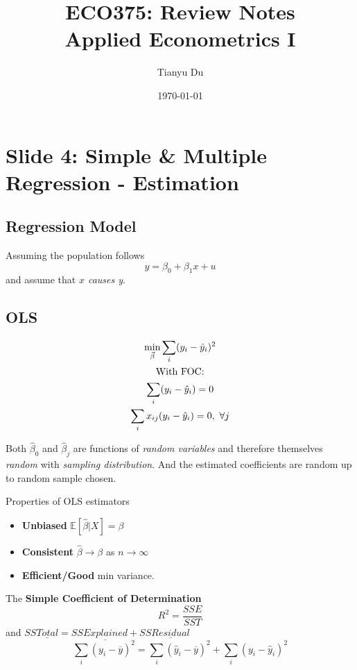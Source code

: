 \documentclass[]{article}
\title{ECO375: Review Notes \\ \small Applied Econometrics I}
\author{Tianyu Du}
\date{\today}
\begin{document}
	\maketitle
	\tableofcontents
	\section{Slide 4: Simple \& Multiple Regression - Estimation}
	\subsection{Regression Model}
	\begin{assumption}
	    Assuming the population follows
	    \[
	        y = \beta_0 + \beta_1 x + u
	    \]
	    and assume that \emph{$x$ causes y}.
	\end{assumption}
	
	\subsection{OLS}
	\begin{gather*}
	    \min_{\vec{\beta}} \sum_{i} (y_i - \hat{y}_i)^2 \\
	    \text{{With FOC:}} \\
	    \sum_{i}(y_i - \hat{y}_i) = 0 \\
	    \sum_{i}x_{ij}(y_i - \hat{y}_i) = 0,\ \forall j
	\end{gather*}
	
	\begin{remark}
	    Both $\hat{\beta}_0$ and $\hat{\beta}_j$ are functions of \emph{random variables} and therefore themselves \emph{random} with \emph{sampling distribution}. And the estimated coefficients are random up to random sample chosen.
	\end{remark}
	
	\begin{property}
	    Properties of OLS estimators
	    \begin{itemize}
	        \item \textbf{Unbiased} $\mathbb{E}[\hat{\beta} | X] = \beta$
	        \item \textbf{Consistent} $\hat{\beta} \to \beta$ as $n \to \infty$
	        \item \textbf{Efficient/Good} min variance.
	    \end{itemize}
	\end{property}
	
	\begin{definition}
	    The \textbf{Simple Coefficient of Determination}
	    \[
	        R^2 = \frac{SSE}{SST}
	    \]
	    and $SS\underline{Total} = SS\underline{Explained} + SS\underline{Residual}$
	    \[
	        \sum_i {(y_i - \overline{y})^2} = \sum_i {(\hat{y}_i - \overline{y})^2} + \sum_i {(y_i - \hat{y}_i)^2}
	    \]
	\end{definition}
	
\end{document}
